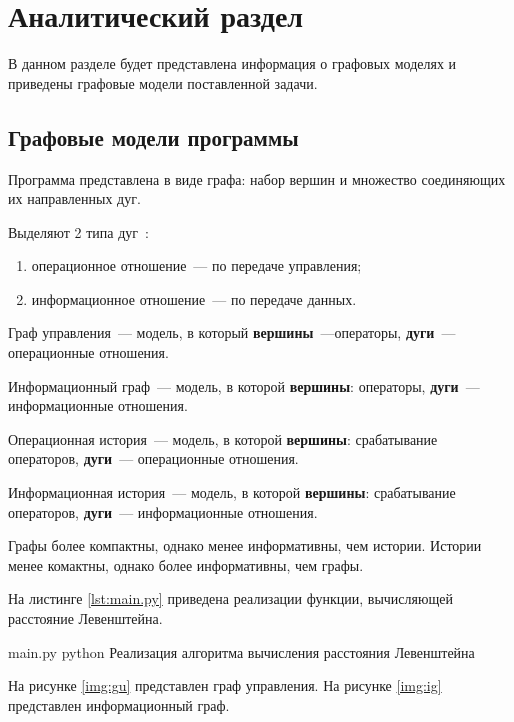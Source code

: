 \chapter{Аналитический раздел}

В данном разделе будет представлена информация о графовых моделях и приведены графовые модели поставленной задачи.


\section{Графовые модели программы}

Программа представлена в виде графа: набор вершин и множество соединяющих их направленных дуг.


Выделяют 2 типа дуг~\cite{graph}:
\begin{enumerate}
	\item операционное отношение~--- по передаче управления;
	\item информационное отношение~--- по передаче данных.
\end{enumerate}

Граф управления~--- модель, в который \textbf{вершины}~---операторы, \textbf{дуги}~--- операционные отношения.

Информационный граф~--- модель, в которой \textbf{вершины}: операторы, \textbf{дуги}~--- информационные отношения.

Операционная история~--- модель, в которой \textbf{вершины}: срабатывание операторов, \textbf{дуги}~--- операционные отношения.

Информационная история~--- модель, в которой \textbf{вершины}: срабатывание операторов, \textbf{дуги}~--- информационные отношения.

Графы более компактны, однако менее информативны, чем истории. Истории менее комактны, однако более информативны, чем графы.

На листинге \ref{lst:main.py} приведена реализации функции, вычисляющей расстояние Левенштейна.

\clearpage

{main.py} %
{python} %
{Реализация алгоритма вычисления расстояния Левенштейна} %

\clearpage


На рисунке \ref{img:gu} представлен граф управления.
На рисунке \ref{img:ig} представлен информационный граф.

